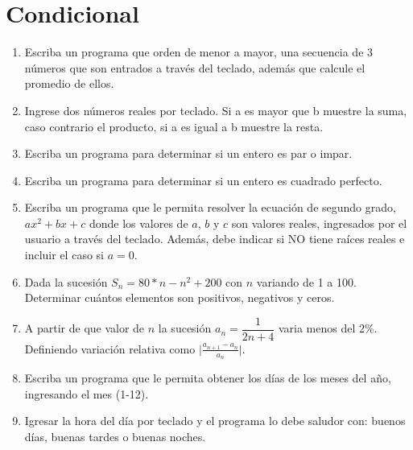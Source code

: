 \documentclass[11pt]{exam}
\begin{document}
\section{Condicional}
\begin{enumerate}

 \item 

Escriba un programa que orden de menor a mayor, una secuencia de 3 n\'umeros que son 
entrados a trav\'es  del teclado, adem\'as que calcule el promedio de ellos.
\item 
 Ingrese dos n\'umeros reales por teclado. Si a es mayor que b muestre la suma, caso 
contrario el producto, si a es igual a b muestre la resta. 
\item 
Escriba un programa para determinar si un  entero es par o impar. 
\item 
Escriba un programa para determinar si un  entero es cuadrado perfecto. 
\item
Escriba un programa que le permita resolver la ecuaci\'on de segundo grado, $ax^{2}+bx+c$ donde los valores
 de $a$, $b$ y $c$ son valores reales, ingresados por el usuario a trav\'es del teclado.  Adem\'as, debe indicar 
si NO tiene ra\'ices reales e incluir el caso si $a = 0$.
\item
 Dada la sucesi\'on $S_n=80*n-n^2+200$ con $n$ variando de 1 a 100. Determinar cu\'antos elementos son 
positivos, negativos  y ceros.
\item
A partir de que valor de $n$ la sucesi\'on $a_{n}=\dfrac{1}{2n+4}$ varia menos del  2\%. 
Definiendo variaci\'on relativa como $\vert\frac{a_{n+1}-a_{n}}{a_{n}}\vert$.
\item 
Escriba un programa que le permita obtener los d\'ias de los meses del a\~no, ingresando el 
mes (1-12).
 \item 
Igresar la hora del d\'ia por teclado y el programa lo debe saludor con: buenos d\'ias, buenas tardes o buenas noches.
\end{enumerate}
\end{document}
